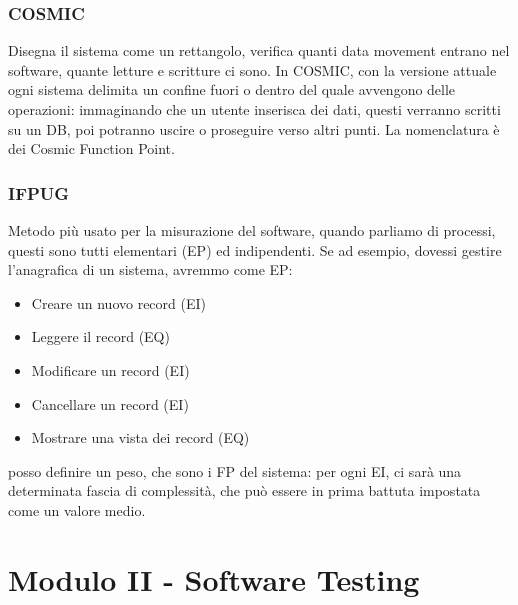 \documentclass{article}
\begin{document}
\subsubsection{COSMIC}
Disegna il sistema come un rettangolo, verifica quanti data movement entrano nel software, quante letture e scritture ci sono. In COSMIC, con la versione attuale ogni sistema delimita un confine fuori o dentro del quale avvengono delle operazioni: immaginando che un utente inserisca dei dati, questi verranno scritti su un DB, poi potranno uscire o proseguire verso altri punti. La nomenclatura è dei Cosmic Function Point.
\subsubsection{IFPUG}
Metodo più usato per la misurazione del software, quando parliamo di processi, questi sono tutti elementari (EP) ed indipendenti. Se ad esempio, dovessi gestire l'anagrafica di un sistema, avremmo come EP:
\begin{itemize}
\item Creare un nuovo record (EI)
\item Leggere il record (EQ)
\item Modificare un record (EI)
\item Cancellare un record (EI)
\item Mostrare una vista dei record (EQ)
\end{itemize}
posso definire un peso, che sono i FP del sistema: per ogni EI, ci sarà una determinata fascia di complessità, che può essere in prima battuta impostata come un valore medio.
\newpage
\section{Modulo II - Software Testing}
\end{document}
